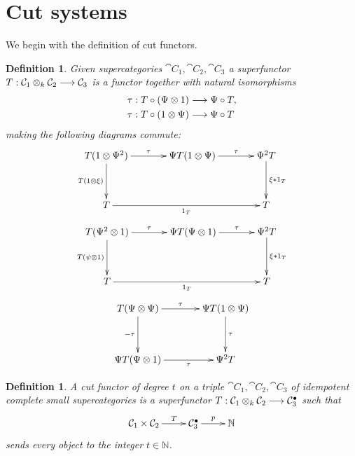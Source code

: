 \documentclass[english,letter paper,12pt,leqno]{article}
\theoremstyle{example}
\newtheorem{definition}[theorem]{Definition}
\numberwithin{equation}{section}
\begin{document}
\section{Cut systems}\label{section:cut_systems}

We begin with the definition of cut functors.

\begin{definition} Given supercategories $\cat{C}_1,\cat{C}_2,\cat{C}_3$ a \emph{superfunctor} $T: \mathcal{C}_1 \otimes_k \mathcal{C}_2 \longrightarrow \mathcal{C}_3$ is a functor together with natural isomorphisms
\begin{align*}
\tau &: T \circ ( \Psi \otimes 1 ) \longrightarrow \Psi \circ T,\\
\tau &: T \circ ( 1 \otimes \Psi ) \longrightarrow \Psi \circ T
\end{align*}
making the following diagrams commute:
\begin{equation}\label{eq:psicomp1}
\xymatrix@R+1pc@C+1pc{
T( 1 \otimes \Psi^2 ) \ar[r]^-{\tau}\ar[d]_-{T(1 \otimes \xi)} & \Psi T( 1 \otimes \Psi ) \ar[r]^-{\tau} & \Psi^2 T \ar[d]^-{\xi * 1_T}\\
T \ar[rr]_-{1_T} & & T
}
\end{equation}
\begin{equation}\label{eq:psicomp2}
\xymatrix@R+1pc@C+1pc{
T( \Psi^2 \otimes 1 ) \ar[r]^-{\tau} \ar[d]_-{T (\psi \otimes 1)}  & \Psi T( \Psi \otimes 1 ) \ar[r]^-{\tau} & \Psi^2 T \ar[d]^-{\xi * 1_T}\\
T \ar[rr]_-{1_T} & & T
}
\end{equation}
\begin{equation}\label{eq:psicomp3}
\xymatrix@R+1pc@C+1pc{
T( \Psi \otimes \Psi ) \ar[r]^-{\tau}\ar[d]_-{-\tau} & \Psi T( 1 \otimes \Psi ) \ar[d]^-{\tau}\\
\Psi T( \Psi \otimes 1 ) \ar[r]_-{\tau} & \Psi^2 T
}
\end{equation}

\end{definition}

\begin{definition}\label{defn:cutfunctor1} A \emph{cut functor of degree $t$} on a triple $\cat{C}_1, \cat{C}_2,\cat{C}_3$ of idempotent complete small supercategories is a superfunctor $T: \mathcal{C}_1 \otimes_k \mathcal{C}_2 \longrightarrow \mathcal{C}_3^\bullet$ such that
\[
\xymatrix{
\cat{C}_1 \times \cat{C}_2 \ar[r]^-{T} & \cat{C}_3^\bullet \ar[r]^-{p} & \mathbb{N}
}
\]
sends every object to the integer $t \in \mathbb{N}$.
\end{definition}
\end{document}
